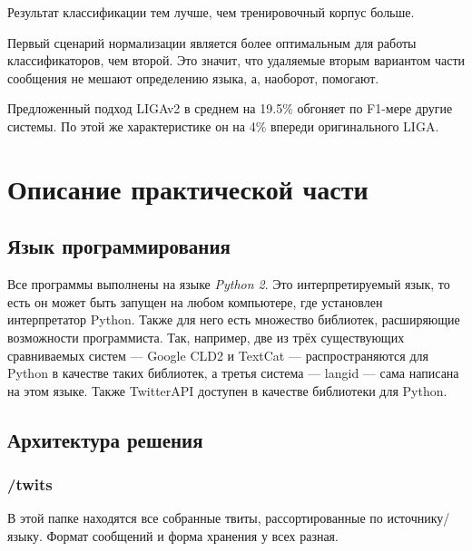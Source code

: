 \documentclass[a4paper, 14pt]{article}
\begin{document}
		Результат классификации тем лучше, чем тренировочный корпус больше.
		
		Первый сценарий нормализации является более оптимальным для работы классификаторов, чем второй. Это значит, что удаляемые вторым вариантом части сообщения не мешают определению языка, а, наоборот, помогают.
		
		Предложенный подход LIGAv2 в среднем на 19.5\% обгоняет по F1-мере другие системы. По этой же характеристике он на 4\% впереди оригинального LIGA.
		
	
\pagebreak		

\section{Описание практической части}
		\subsection{Язык программирования}
		Все программы выполнены на языке \textit{Python 2}. Это интерпретируемый язык, то есть он может быть запущен на любом компьютере, где установлен интерпретатор Python. Также для него есть множество библиотек, расширяющие возможности программиста. Так, например, две из трёх существующих сравниваемых систем --- Google CLD2 и TextCat --- распространяются для Python в качестве таких библиотек, а третья система --- langid --- сама написана на этом языке. Также TwitterAPI доступен в качестве библиотеки для Python.
		
		\subsection{Архитектура решения}
			\subsubsection{/twits}
			В этой папке находятся все собранные твиты, рассортированные по источнику/языку. Формат сообщений и форма хранения у всех разная.
\end{document}
